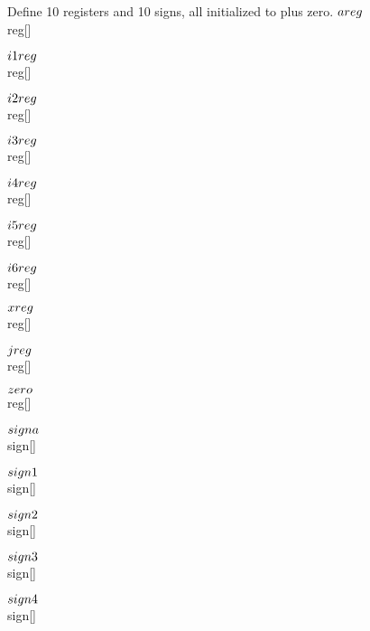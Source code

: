 Define 10 registers and 10 signs, all initialized  to plus zero.
\Y\B\4\D$\\{areg}$ \5
\\{reg}[]\par
\B\4\D$\\{i1reg}$ \5
\\{reg}[]\par
\B\4\D$\\{i2reg}$ \5
\\{reg}[]\par
\B\4\D$\\{i3reg}$ \5
\\{reg}[]\par
\B\4\D$\\{i4reg}$ \5
\\{reg}[]\par
\B\4\D$\\{i5reg}$ \5
\\{reg}[]\par
\B\4\D$\\{i6reg}$ \5
\\{reg}[]\par
\B\4\D$\\{xreg}$ \5
\\{reg}[]\par
\B\4\D$\\{jreg}$ \5
\\{reg}[]\par
\B\4\D$\\{zero}$ \5
\\{reg}[]\par
\B\4\D$\\{signa}$ \5
\\{sign}[]\par
\B\4\D$\\{sign1}$ \5
\\{sign}[]\par
\B\4\D$\\{sign2}$ \5
\\{sign}[]\par
\B\4\D$\\{sign3}$ \5
\\{sign}[]\par
\B\4\D$\\{sign4}$ \5
\\{sign}[]\par
